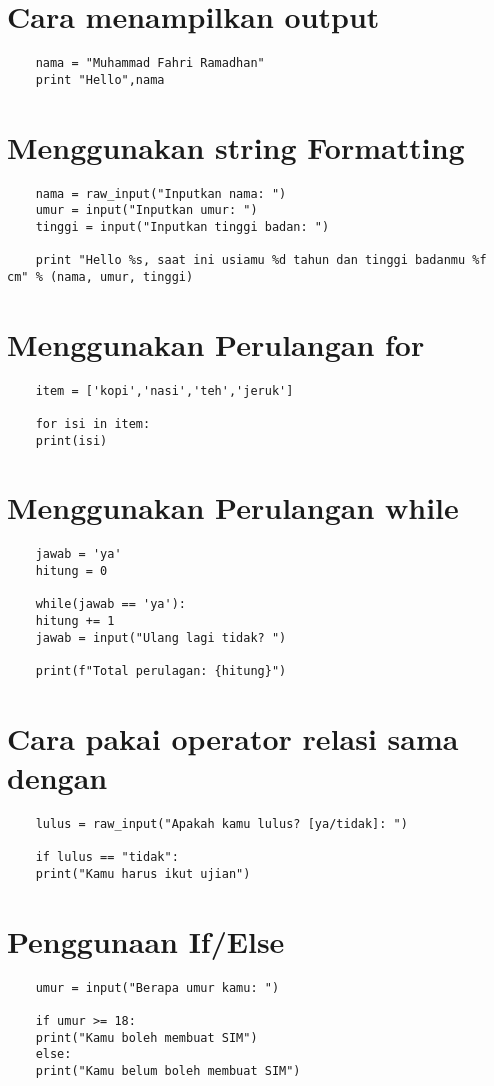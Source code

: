 \documentclass{article}
\begin{document}
\section{Cara menampilkan output}
\begin{lstlisting}
	nama = "Muhammad Fahri Ramadhan"
	print "Hello",nama
\end{lstlisting}

\section{Menggunakan string Formatting}
\begin{lstlisting}
	nama = raw_input("Inputkan nama: ")
	umur = input("Inputkan umur: ")
	tinggi = input("Inputkan tinggi badan: ")
	
	print "Hello %s, saat ini usiamu %d tahun dan tinggi badanmu %f cm" % (nama, umur, tinggi)
\end{lstlisting}

\section{Menggunakan Perulangan for}
\begin{lstlisting}
	item = ['kopi','nasi','teh','jeruk']
	
	for isi in item:
	print(isi)
\end{lstlisting}

\section{Menggunakan Perulangan while}
\begin{lstlisting}
	jawab = 'ya'
	hitung = 0
	
	while(jawab == 'ya'):
	hitung += 1
	jawab = input("Ulang lagi tidak? ")
	
	print(f"Total perulagan: {hitung}")
\end{lstlisting}

\section{Cara pakai operator relasi sama dengan}
\begin{lstlisting}
	lulus = raw_input("Apakah kamu lulus? [ya/tidak]: ")
	
	if lulus == "tidak":
	print("Kamu harus ikut ujian")
\end{lstlisting}

\section{Penggunaan If/Else}
\begin{lstlisting}
	umur = input("Berapa umur kamu: ")
	
	if umur >= 18:
	print("Kamu boleh membuat SIM")
	else:
	print("Kamu belum boleh membuat SIM")
\end{lstlisting}
\end{document}
